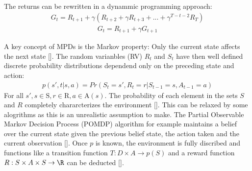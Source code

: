 \documentclass[letterpaper,10pt,english]{jupyterBook}
\begin{document}
\sphinxAtStartPar
The returns can be rewritten in a dynammic programming approach:
\begin{equation*}
\begin{split} G_t = R_{t+1} + \gamma(R_{t+2} + \gamma R_{t+3} + ... + \gamma^{T-t-2}R_T) \end{split}
\end{equation*}\begin{equation*}
\begin{split} G_t = R_{t+1} + \gamma G_{t+1}\end{split}
\end{equation*}
\sphinxAtStartPar
{}

\sphinxAtStartPar
A key concept of MPDs is the Markov property: Only the current state affects the next state {[}{]}. The random varianbles (RV) \(R_t\) and \(S_t\) have then well defined discrete probability distributions dependend only on the preceding state and action:
\begin{equation*}
\begin{split} p(s', t| s, a) = Pr(S_t = s', R_t = r | S_{t-1} = s, A_{t-1}=a) \end{split}
\end{equation*}
\sphinxAtStartPar
For all \(s', s \in \mathrm{S} , r \in \mathrm{R}, a \in \mathrm{A}(s) \). The probability of each element in the sets \(S\) and \(R\) completely chararcterizes the environment {[}{]}. This can be relaxed by some alogrithms as this is an unrealistic assumption to make. The Partial Observable Markov Decision Process (POMDP) algorithm for example maintains a belief over the current state given the previous belief state, the action taken and the current observation {[}{]}.  Once \(p\) is known, the environment is fully discribed and functions like a transition function \(T : D \times A \to p(S)\) and a reward function \(R: S \times A \times S \to \R\) can be deducted {[}{]}.
\end{document}
